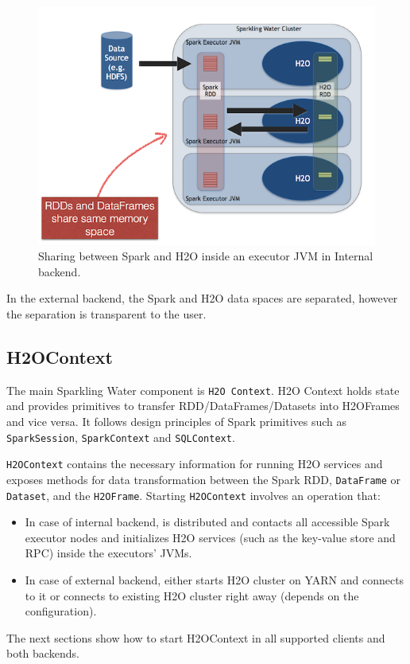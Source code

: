 \documentclass{standalone}
\begin{document}
    \begin{figure}[h!]
        \centering
        \includegraphics[scale=1]{../images/DataShare.png}
        \caption{Sharing between Spark and H2O inside an executor JVM in Internal backend.}
    \end{figure}

    In the external backend, the Spark and H2O data spaces are separated, however the separation is transparent to the user.

    \subsection{H2OContext}

    The main Sparkling Water component is \texttt{H2O Context}.
    H2O Context holds state and provides primitives to transfer RDD/DataFrames/Datasets into H2OFrames and vice versa.
    It follows design principles of Spark primitives such as \texttt{SparkSession}, \texttt{SparkContext} and \texttt{SQLContext}.


    \texttt{H2OContext} contains the necessary information for running H2O services and exposes methods for data
    transformation between the Spark RDD, \texttt{DataFrame} or \texttt{Dataset}, and the \texttt{H2OFrame}.
    Starting \texttt{H2OContext} involves an operation that:

    \begin{itemize}
        \item In case of internal backend, is distributed and contacts all accessible Spark executor nodes and initializes H2O services (such as the key-value store and RPC) inside the executors' JVMs.
        \item In case of external backend, either starts H2O cluster on YARN and connects to it or connects to existing H2O cluster right away (depends on the configuration).
    \end{itemize}

    The next sections show how to start H2OContext in all supported clients and both backends.
\end{document}
